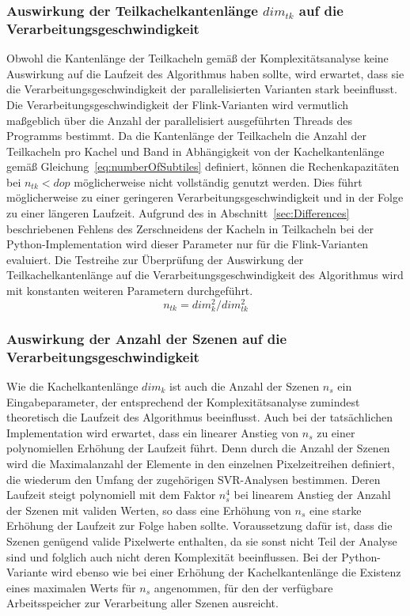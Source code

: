 \subsubsection{Auswirkung der Teilkachelkantenlänge $dim_{tk}$ auf die Verarbeitungsgeschwindigkeit}
Obwohl die Kantenlänge der Teilkacheln gemäß der Komplexitätsanalyse keine Auswirkung auf die Laufzeit des Algorithmus haben sollte, wird erwartet, dass sie die Verarbeitungsgeschwindigkeit der parallelisierten Varianten stark beeinflusst. Die Verarbeitungsgeschwindigkeit der Flink-Varianten wird vermutlich maßgeblich über die Anzahl der parallelisiert ausgeführten Threads des Programms bestimmt. Da die Kantenlänge der Teilkacheln die Anzahl der Teilkacheln pro Kachel und Band in Abhängigkeit von der Kachelkantenlänge gemäß Gleichung~\ref{eq:numberOfSubtiles} definiert, können die Rechenkapazitäten bei $n_{tk} < dop$ möglicherweise nicht vollständig genutzt werden. Dies führt möglicherweise zu einer geringeren Verarbeitungsgeschwindigkeit und in der Folge zu einer längeren Laufzeit. Aufgrund des in Abschnitt~\ref{sec:Differences} beschriebenen Fehlens des Zerschneidens der Kacheln in Teilkacheln bei der Python-Implementation wird dieser Parameter nur für die Flink-Varianten evaluiert. Die Testreihe zur Überprüfung der Auswirkung der Teilkachelkantenlänge auf die Verarbeitungsgeschwindigkeit des Algorithmus wird mit konstanten weiteren Parametern durchgeführt.
%
\begin{equation} \label{eq:numberOfSubtiles}
n_{tk} = {dim_{k}^2} / {dim_{tk}^2}
\end{equation}
%
\subsubsection{Auswirkung der Anzahl der Szenen auf die Verarbeitungsgeschwindigkeit}
Wie die Kachelkantenlänge $dim_k$ ist auch die Anzahl der Szenen $n_s$ ein Eingabeparameter, der entsprechend der Komplexitätsanalyse zumindest theoretisch die Laufzeit des Algorithmus beeinflusst. Auch bei der tatsächlichen Implementation wird erwartet, dass ein linearer Anstieg von $n_s$ zu einer polynomiellen Erhöhung der Laufzeit führt. Denn durch die Anzahl der Szenen wird die Maximalanzahl der Elemente in den einzelnen Pixelzeitreihen definiert, die wiederum den Umfang der zugehörigen SVR-Analysen bestimmen. Deren Laufzeit steigt polynomiell mit dem Faktor $n_s^4$ bei linearem Anstieg der Anzahl der Szenen mit validen Werten, so dass eine Erhöhung von $n_s$ eine starke Erhöhung der Laufzeit zur Folge haben sollte. Voraussetzung dafür ist, dass die Szenen genügend valide Pixelwerte enthalten, da sie sonst nicht Teil der Analyse sind und folglich auch nicht deren Komplexität beeinflussen. Bei der Python-Variante wird ebenso wie bei einer Erhöhung der Kachelkantenlänge die Existenz eines maximalen Werts für $n_s$ angenommen, für den der verfügbare Arbeitsspeicher zur Verarbeitung aller Szenen ausreicht.

